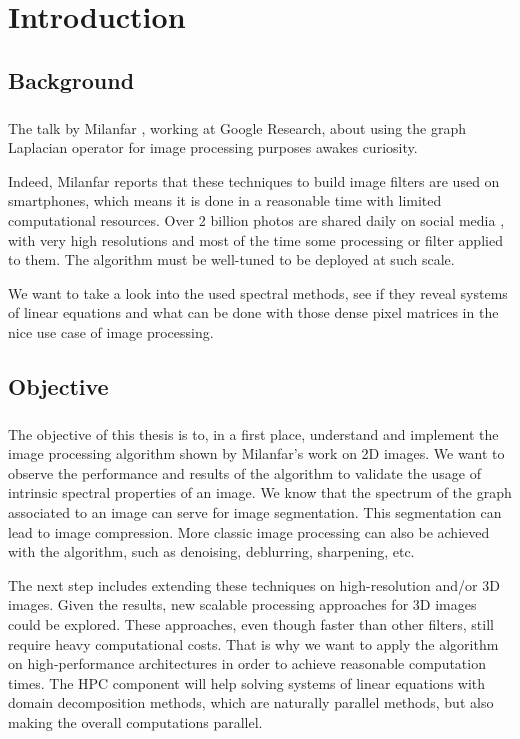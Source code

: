 \chapter{Introduction}

\section{Background}

\paragraph{}
The talk by Milanfar \cite{siam_slides_2016}, working at Google Research, about using the graph Laplacian operator for image processing purposes awakes curiosity.

Indeed, Milanfar reports that these techniques to build image filters are used on smartphones, which means it is done in a reasonable time with limited computational resources.
Over 2 billion photos are shared daily on social media \cite{siam_slides_2016}, with very high resolutions and most of the time some processing or filter applied to them.
The algorithm must be well-tuned to be deployed at such scale.

We want to take a look into the used spectral methods, see if they reveal systems of linear equations and what can be done with those dense pixel matrices in the nice use case of image processing.

\section{Objective}

\paragraph{}
The objective of this thesis is to, in a first place, understand and implement the image processing algorithm shown by Milanfar's work on 2D images.
We want to observe the performance and results of the algorithm to validate the usage of intrinsic spectral properties of an image.
We know that the spectrum of the graph associated to an image can serve for image segmentation.
This segmentation can lead to image compression.
More classic image processing can also be achieved with the algorithm, such as denoising, deblurring, sharpening, etc.

The next step includes extending these techniques on high-resolution and/or 3D images.
Given the results, new scalable processing approaches for 3D images could be explored.
These approaches, even though faster than other filters, still require heavy computational costs.
That is why we want to apply the algorithm on high-performance architectures in order to achieve reasonable computation times.
The HPC component will help solving systems of linear equations with domain decomposition methods, which are naturally parallel methods, but also making the overall computations parallel.

